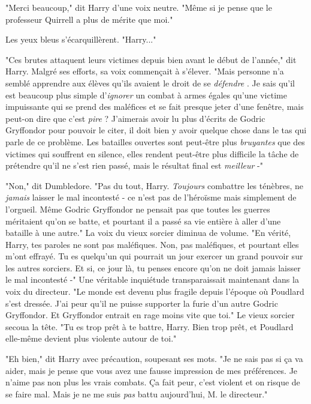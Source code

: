 "Merci beaucoup," dit Harry d'une voix neutre. "Même si je pense que le professeur Quirrell a plus de mérite que moi."

Les yeux bleus s'écarquillèrent. "Harry..."

"Ces brutes attaquent leurs victimes depuis bien avant le début de l'année," dit Harry. Malgré ses efforts, sa voix commençait à s'élever. "Mais personne n'a semblé apprendre aux élèves qu'ils avaient le droit de se \emph{défendre} . Je sais qu'il est beaucoup plus simple d'\emph{ignorer}  un combat à armes égales qu'une victime impuissante qui se prend des maléfices et se fait presque jeter d'une fenêtre, mais peut-on dire que c'est \emph{pire}  ? J'aimerais avoir lu plus d'écrits de Godric Gryffondor pour pouvoir le citer, il doit bien y avoir quelque chose dans le tas qui parle de ce problème. Les batailles ouvertes sont peut-être plus \emph{bruyantes}  que des victimes qui souffrent en silence, elles rendent peut-être plus difficile la tâche de prétendre qu'il ne s'est rien passé, mais le résultat final est \emph{meilleur}  -"

"Non," dit Dumbledore. "Pas du tout, Harry. \emph{Toujours}  combattre les ténèbres, ne \emph{jamais}  laisser le mal incontesté - ce n'est pas de l'héroïsme mais simplement de l'orgueil. Même Godric Gryffondor ne pensait pas que toutes les guerres méritaient qu'on se batte, et pourtant il a passé sa vie entière à aller d'une bataille à une autre." La voix du vieux sorcier diminua de volume. "En vérité, Harry, tes paroles ne sont pas maléfiques. Non, pas maléfiques, et pourtant elles m'ont effrayé. Tu es quelqu'un qui pourrait un jour exercer un grand pouvoir sur les autres sorciers. Et si, ce jour là, tu penses encore qu'on ne doit jamais laisser le mal incontesté -" Une véritable inquiétude transparaissait maintenant dans la voix du directeur. "Le monde est devenu plus fragile depuis l'époque où Poudlard s'est dressée. J'ai peur qu'il ne puisse supporter la furie d'un autre Godric Gryffondor. Et Gryffondor entrait en rage moins vite que toi." Le vieux sorcier secoua la tête. "Tu es trop prêt à te battre, Harry. Bien trop prêt, et Poudlard elle-même devient plus violente autour de toi."

"Eh bien," dit Harry avec précaution, soupesant ses mots. "Je ne sais pas si ça va aider, mais je pense que vous avez une fausse impression de mes préférences. Je n'aime pas non plus les vrais combats. Ça fait peur, c'est violent et on risque de se faire mal. Mais je ne me suis \emph{pas}  battu aujourd'hui, M. le directeur."

